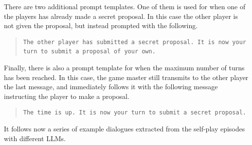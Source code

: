 There are two additional prompt templates. One of them is used for when one of the players has already made a secret proposal. In this case the other player is not given the proposal, but instead prompted with the following.

\begin{quote}
\small
\begin{verbatim}
The other player has submitted a secret proposal. It is now your turn to submit a proposal of your own.
\end{verbatim}
\end{quote}

Finally, there is also a prompt template for when the maximum number of turns has been reached. In this case, the game master still transmits to the other player the last message, and immediately follows it with the following message instructing the player to make a proposal.

\begin{quote}
\small
\begin{verbatim}
The time is up. It is now your turn to submit a secret proposal.
\end{verbatim}
\end{quote}

It follows now a series of example dialogues extracted from the self-play episodes with different LLMs.















